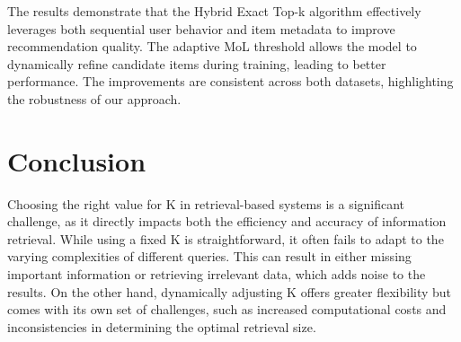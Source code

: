 \documentclass[review]{jair}
\begin{document}
The results demonstrate that the Hybrid Exact Top-k algorithm effectively leverages both sequential user behavior and item metadata to improve recommendation quality. The adaptive MoL threshold allows the model to dynamically refine candidate items during training, leading to better performance. The improvements are consistent across both datasets, highlighting the robustness of our approach.\\
\bigskip
\begin{minipage}{\hsize}%
	\lstset{frame=single,framexleftmargin=-1pt,framexrightmargin=-17pt,framesep=12pt,linewidth=0.98\textwidth,language=pascal}%
	
\end{minipage}



\section{Conclusion}\label{sec13}

Choosing the right value for K in retrieval-based systems is a significant challenge, as it directly impacts both the efficiency and accuracy of information retrieval. While using a fixed K is straightforward, it often fails to adapt to the varying complexities of different queries. This can result in either missing important information or retrieving irrelevant data, which adds noise to the results. On the other hand, dynamically adjusting K offers greater flexibility but comes with its own set of challenges, such as increased computational costs and inconsistencies in determining the optimal retrieval size.
\end{document}
